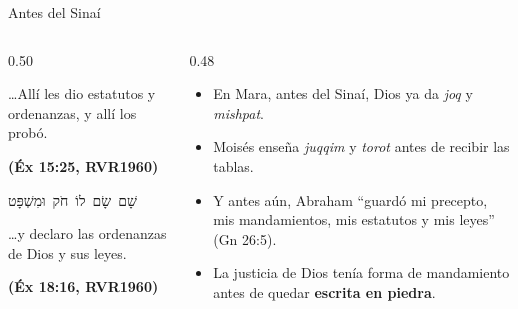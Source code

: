 \documentclass[hyperref={bookmarks=false},aspectratio=169]{beamer}
\newcommand{\heb}[1]{\mbox{\foreignlanguage{hebrew}{#1}}}
\newcommand{\fuente}[1]{\par\hfill{\upshape\bfseries\footnotesize\textcolor{azul}{#1}}}
\newcommand{\destacar}[1]{\textbf{\textcolor{azul}{#1}}}
\begin{document}
\begin{frame}{Antes del Sinaí}
\begin{columns}[c,onlytextwidth]
\begin{column}{0.50\textwidth}
\begin{cita}\ldots{}Allí les dio estatutos y ordenanzas, y allí los probó.\fuente{(Éx 15:25, RVR1960)}\end{cita}
\begin{center}\heb{שָׁם שָׂם לוֹ חֹק וּמִשְׁפָּט}\end{center}
\begin{cita}\ldots{}y declaro las ordenanzas de Dios y sus leyes.\fuente{(Éx 18:16, RVR1960)}\end{cita}
\end{column}
\begin{column}{0.48\textwidth}\small
\begin{itemize}
\item En Mara, antes del Sinaí, Dios ya da \emph{joq} y \emph{mishpat}.
\item Moisés enseña \emph{juqqim} y \emph{torot} antes de recibir las tablas.
\item Y antes aún, Abraham ``guardó mi precepto, mis mandamientos, mis estatutos y mis leyes'' (Gn 26:5).
\item La justicia de Dios tenía forma de mandamiento antes de quedar \destacar{escrita en piedra}.
\end{itemize}
\end{column}
\end{columns}
\end{frame}
\end{document}

